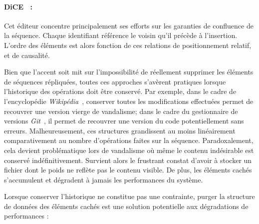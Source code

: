 \paragraph{DiCE~\cite{conway2014language} :} Cet éditeur concentre
principalement ses efforts sur les garanties de confluence de la
séquence. Chaque identifiant référence le voisin qu'il précède à
l'insertion. L'ordre des éléments est alors fonction de ces relations de
positionnement relatif, et de causalité.


Bien que l'accent soit mit sur l'impossibilité de réellement supprimer les
éléments de séquences répliquées, toutes ces approches s'avèrent pratiques
lorsque l'historique des opérations doit être conservé. Par exemple, dans le
cadre de l'encyclopédie \emph{Wikipédia}~\cite{wikipedia}, conserver toutes les
modifications effectuées permet de recouvrer une version vierge de vandalisme;
dans le cadre du gestionnaire de versions \emph{Git}~\cite{git}, il permet de
recouvrer une version du code potentiellement sans erreurs. Malheureusement, ces
structures grandissent au moins linéairement comparativement au nombre
d'opérations faites sur la séquence. Paradoxalement, cela devient problématique
lors de vandalisme où même le contenu indésirable est conservé
indéfinitivement. Survient alors le frustrant constat d'avoir à stocker un
fichier dont le poids ne reflète pas le contenu visible. De plus, les éléments
cachés s'accumulent et dégradent à jamais les performances du système.

Lorsque conserver l'historique ne constitue pas une contrainte, purger la
structure de données des éléments cachés est une solution potentielle aux
dégradations de performances :

